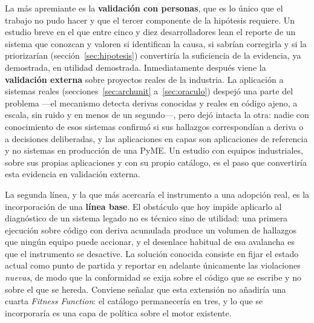 La más apremiante es la \textbf{validación con personas}, que es lo único que el trabajo no pudo hacer y que el tercer componente de la hipótesis requiere. Un estudio breve en el que entre cinco y diez desarrolladores lean el reporte de un sistema que conozcan y valoren si identifican la causa, si sabrían corregirla y si la priorizarían (sección~\ref{sec:hipotesis}) convertiría la suficiencia de la evidencia, ya demostrada, en utilidad demostrada. Inmediatamente después viene la \textbf{validación externa} sobre proyectos reales de la industria. La aplicación a sistemas reales (secciones~\ref{sec:archunit} a~\ref{sec:oraculo}) despejó una parte del problema ---el mecanismo detecta derivas conocidas y reales en código ajeno, a escala, sin ruido y en menos de un segundo---, pero dejó intacta la otra: nadie con conocimiento de esos sistemas confirmó si sus hallazgos correspondían a deriva o a decisiones deliberadas, y las aplicaciones en capas son aplicaciones de referencia y no sistemas en producción de una PyME. Un estudio con equipos industriales, sobre sus propias aplicaciones y con su propio catálogo, es el paso que convertiría esta evidencia en validación externa.

La segunda línea, y la que más acercaría el instrumento a una adopción real, es la incorporación de una \textbf{línea base}. El obstáculo que hoy impide aplicarlo al diagnóstico de un sistema legado no es técnico sino de utilidad: una primera ejecución sobre código con deriva acumulada produce un volumen de hallazgos que ningún equipo puede accionar, y el desenlace habitual de esa avalancha es que el instrumento se desactive. La solución conocida consiste en fijar el estado actual como punto de partida y reportar en adelante únicamente las violaciones \emph{nuevas}, de modo que la conformidad se exija sobre el código que se escribe y no sobre el que se hereda. Conviene señalar que esta extensión no añadiría una cuarta \textit{Fitness Function}: el catálogo permanecería en tres, y lo que se incorporaría es una capa de política sobre el motor existente.

